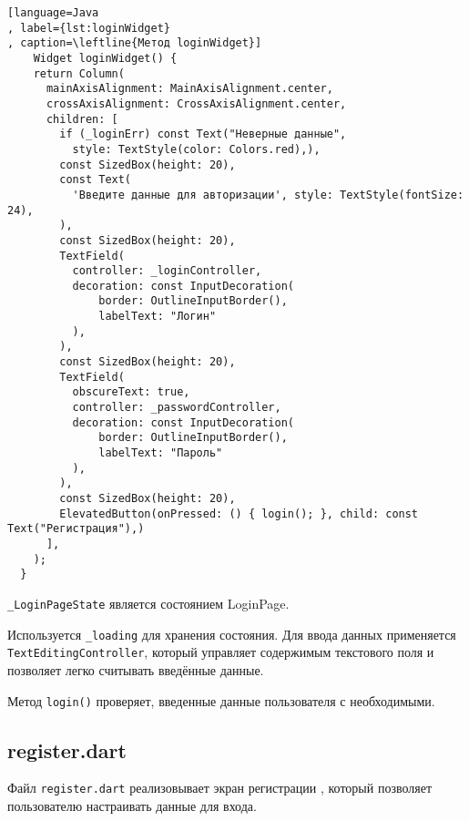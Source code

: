 \begin{lstlisting}[language=Java
, label={lst:loginWidget}
, caption=\leftline{Метод loginWidget}]
	Widget loginWidget() {
    return Column(
      mainAxisAlignment: MainAxisAlignment.center,
      crossAxisAlignment: CrossAxisAlignment.center,
      children: [
        if (_loginErr) const Text("Неверные данные",
          style: TextStyle(color: Colors.red),),
        const SizedBox(height: 20),
        const Text(
          'Введите данные для авторизации', style: TextStyle(fontSize: 24),
        ),
        const SizedBox(height: 20),
        TextField(
          controller: _loginController,
          decoration: const InputDecoration(
              border: OutlineInputBorder(),
              labelText: "Логин"
          ),
        ),
        const SizedBox(height: 20),
        TextField(
          obscureText: true,
          controller: _passwordController,
          decoration: const InputDecoration(
              border: OutlineInputBorder(),
              labelText: "Пароль"
          ),
        ),
        const SizedBox(height: 20),
        ElevatedButton(onPressed: () { login(); }, child: const Text("Регистрация"),)
      ],
    );
  }
\end{lstlisting}



\texttt{\_LoginPageState} является состоянием LoginPage.\par
Используется  \texttt{\_loading} для хранения состояния.
Для ввода данных применяется \texttt{TextEditingController},
который управляет содержимым текстового поля
и позволяет легко считывать введённые данные.


Метод \texttt{login()} проверяет, введенные данные пользователя с необходимыми.
\clearpage

\subsection{register.dart}

Файл \texttt{register.dart}
реализовывает экран регистрации ,
который позволяет пользователю настраивать данные для входа.

